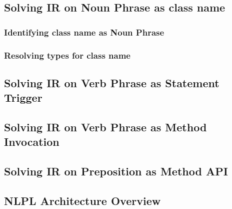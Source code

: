 \subsection{Solving IR on Noun Phrase as class name}

\subsubsection{Identifying  class name as Noun Phrase}
\subsubsection{Resolving types for  class name}
\subsection{Solving IR on Verb Phrase as Statement Trigger}
\subsection{Solving IR on Verb Phrase as Method Invocation}
\subsection{Solving IR on Preposition as Method API}

\subsection{NLPL Architecture Overview}


